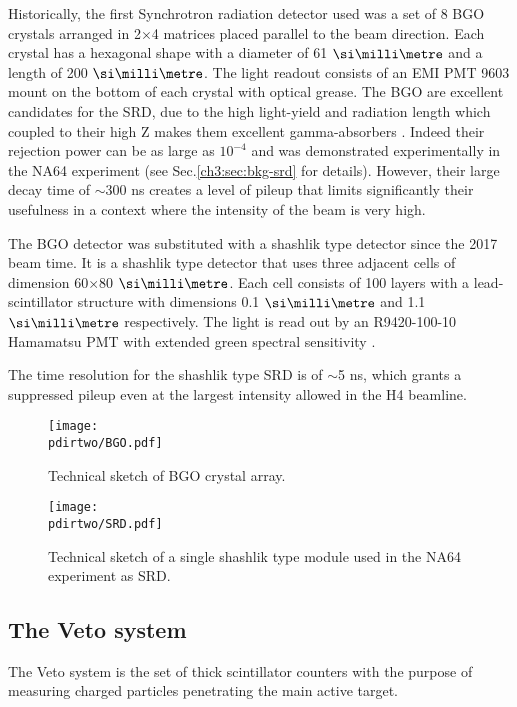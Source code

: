 Historically, the first Synchrotron radiation detector used was a set of 8 BGO crystals arranged in 2$\times$4 matrices placed parallel to the beam direction. Each crystal has a hexagonal shape with a diameter of 61 $\mmi$ and a length of 200 $\mmi$. The light readout consists of an EMI PMT 9603 mount on the bottom of each crystal with optical grease. The BGO are excellent candidates for the SRD, due to the high light-yield and radiation length which coupled to their high Z makes them excellent gamma-absorbers \cite{bgo-crystal}. Indeed their rejection power can be as large as $10^{-4}$ and was demonstrated experimentally in the NA64 experiment (see Sec.\ref{ch3:sec:bkg-srd} for details). However, their large decay time of $\sim$300 \si{ns} creates a level of pileup that limits significantly their usefulness in a context where the intensity of the beam is very high.

The BGO detector was substituted with a shashlik type detector since the 2017 beam time. It is a shashlik type detector that uses three adjacent cells of dimension 60$\times$80 $\mmi$. Each cell consists of 100 layers with a lead-scintillator structure with dimensions 0.1 $\mmi$ and 1.1 $\mmi$ respectively. The light is read out by an R9420-100-10 Hamamatsu PMT with extended green spectral sensitivity \cite{hamamatsu-R9420-100-10}.

The time resolution for the shashlik type SRD is of $\sim$5 \si{ns}, which grants a suppressed pileup even at the largest intensity allowed in the H4 beamline.

\begin{figure}[bth!]
\centering
\texttt{[image: \\pdirtwo/BGO.pdf]}
\caption[BGO sketch]{Technical sketch of BGO crystal array.}
\label{fig:bgo-sketch}
\end{figure}

\begin{figure}[bth!]
\centering
\texttt{[image: \\pdirtwo/SRD.pdf]}
\caption[SRD sketch]{Technical sketch of a single shashlik type module used in the NA64 experiment as SRD.}
\label{fig:srd-sketch}
\end{figure}

\subsection{The Veto system}
\label{ch2:sec:detectors-veto}

The Veto system is the set of thick scintillator counters with the purpose of measuring charged particles penetrating the main active target.

